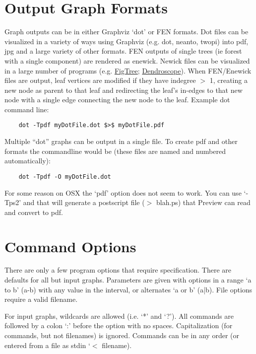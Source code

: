 \documentclass[11pt]{article}
\begin{document}
	
	\section{Output Graph Formats}
	Graph outputs can be in either Graphviz `dot' or FEN formats.  Dot files can be visualized in a variety of ways 
	using Graphviz (e.g. dot, neanto, twopi) into pdf, jpg and a large variety of other formats. FEN outputs of 
	single trees (ie forest with a single component) are rendered as enewick.  Newick files can be visualized in a 
	large number of programs (e.g. \href{http://tree.bio.ed.ac.uk/software/figtree/}{FigTree}; \href{http:/https://uni-tuebingen.de/fakultaeten/mathematisch-naturwissenschaftliche-fakultaet/fachbereiche/informatik/lehrstuehle/algorithms-in-bioinformatics/software/}{Dendroscope}). 	
	When FEN/Enewick files are output, leaf vertices are modified if they have indegree $>$ 1, creating a new node as parent to that leaf
	and redirecting the leaf's in-edges to that new node with a single edge connecting the new node to the leaf.  Example dot command line: 
	\begin{verbatim}
	dot -Tpdf myDotFile.dot $>$ myDotFile.pdf
	\end{verbatim}
			
	Multiple ``dot'' graphs can be output in a single file.  To create pdf and other formats the
	commandline would be (these files are named and numbered automatically):
	\begin{verbatim}
	dot -Tpdf -O myDotFile.dot
	\end{verbatim}

	For some reason on OSX the `pdf' option does not seem to work.  You can use `-Tps2' and that will generate a postscript file ($>$ blah.ps) that Preview can read and convert to pdf.
	
	\section{Command Options}
	There are only a few program options that require specification.  There are defaults for all but input
	 graphs.  Parameters are given with options in a range `a to b' (a-b) with any value in the interval, or
	  alternates `a or b' (a|b). File options require a valid filename.
	  
	For input graphs, wildcards are allowed (i.e. `*' and `?').  All commands are followed by a colon `:' before the option with no spaces.  Capitalization (for commands, but not filenames) is ignored.  Commands can be in any order (or entered from a file as stdin `$<$ filename).
	
\end{document}
